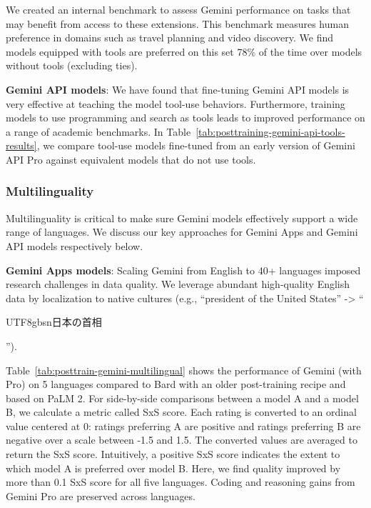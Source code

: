 We created an internal benchmark to assess Gemini performance on tasks that may benefit from access to these extensions. This benchmark measures human preference in domains such as travel planning and video discovery. We find models equipped with tools are preferred on this set 78\% of the time over models without tools (excluding ties).

\textbf{Gemini API models}: We have found that fine-tuning Gemini API models is very effective at teaching the model tool-use behaviors. Furthermore, training models to use programming and search as tools leads to improved performance on a range of academic benchmarks. In Table~\ref{tab:posttraining-gemini-api-tools-results}, we compare tool-use models fine-tuned from an early version of Gemini API Pro against equivalent models that do not use tools.

\subsubsection{Multilinguality}
\label{sec:post-training-ml}

Multilinguality is critical to make sure Gemini models effectively support a wide range of languages. We discuss our key approaches for Gemini Apps and Gemini API models respectively below. 

\textbf{Gemini Apps models}: Scaling Gemini from English to 40+ languages imposed research challenges in data quality. We leverage abundant high-quality English data by localization to native cultures (e.g., “president of the United States” -> “

\begin{CJK*}{UTF8}{gbsn}日本の首相\end{CJK*}

”). 

Table~\ref{tab:posttrain-gemini-multilingual} shows the performance of Gemini (with Pro) on 5 languages compared to Bard with an older post-training recipe and based on PaLM 2. For side-by-side comparisons between a model A and a model B, we calculate a metric called SxS score. Each rating is converted to an ordinal value centered at 0: ratings preferring A are positive and ratings preferring B are negative over a scale between -1.5 and 1.5. The converted values are averaged to return the SxS score. Intuitively, a positive SxS score indicates the extent to which model A is preferred over model B. Here, we find quality improved by more than 0.1 SxS score for all five languages. Coding and reasoning gains from Gemini Pro are preserved across languages.

